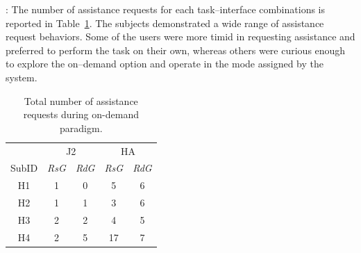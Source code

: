 \documentclass[conference]{IEEEtran}
\begin{document}
: The number of assistance requests for each task--interface combinations is reported in Table~\ref{ONDEMAND}. The subjects demonstrated a wide range of assistance request behaviors. Some of the users were more timid in requesting assistance and preferred to perform the task on their own, whereas others were curious enough to explore the on--demand option and operate in the mode assigned by the system. 

%		


\begin{table}
	\centering
 \begin{tabular}{ccccc}
	\toprule
	&\multicolumn{2}{c}{J2}
	&
	\multicolumn{2}{c}{HA} \\\cmidrule(r){2-3}\cmidrule(l){4-5}
	SubID &\textit{RsG}& \textit{RdG}    & \textit{RsG} &\textit{RdG}      \\
	\bottomrule
	H1 &1& 0   & 5 & 6  \\
	\bottomrule
	H2 &1& 1    & 3 & 6      \\
	\bottomrule
	H3 &2& 2    & 4 &5    \\
	\bottomrule
	H4 &2& 5    & 17 &7   \\
	\bottomrule
\end{tabular}
\vspace{.2cm}
\caption{Total number of assistance requests during on-demand paradigm.}
\label{ONDEMAND}
\end{table}
\end{document}
